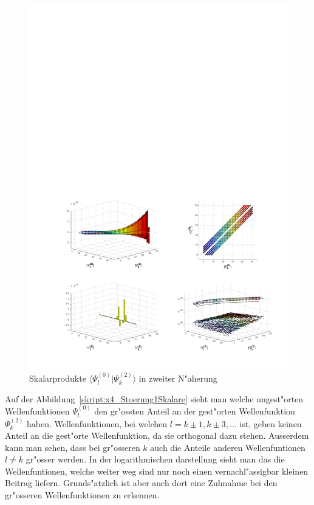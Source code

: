 \begin{refsection}
\begin{figure}[h]	%
\centering
\includegraphics[width=1.0\textwidth]{anharmonisch/images/x4/Stoerung2Skalare.pdf}
\caption{Skalarprodukte $\langle\Psi_l^{(0)}|\Psi_k^{(2)}\rangle$ in zweiter N"aherung
\label{skript:x4_Stoerung2Skalare}}
\end{figure}

Auf der Abbildung~\ref{skript:x4_Stoerung1Skalare} sieht man welche ungest"orten Wellenfunktionen $\Psi_l^{(0)}$ den gr"ossten Anteil an der gest"orten Wellenfunktion $\Psi_k^{(2)}$ haben. Wellenfunktionen, bei welchen $l=k\pm 1,k\pm 3,\dots$ ist, geben keinen Anteil an die gest"orte Wellenfunktion, da sie orthogonal dazu stehen. Ausserdem kann man sehen, dass bei gr"osseren $k$ auch die Anteile anderen Wellenfuntionen $l\neq k$ gr"osser werden. In der logarithmischen darstellung sieht man das die Wellenfuntionen, welche weiter weg sind nur noch einen vernachl"assigbar kleinen Beitrag liefern. Grunds"atzlich ist aber auch dort eine Zuhnahme bei den gr"osseren Wellenfunktionen zu erkennen.

\printbibliography[heading=subbibliography]
\end{refsection}

